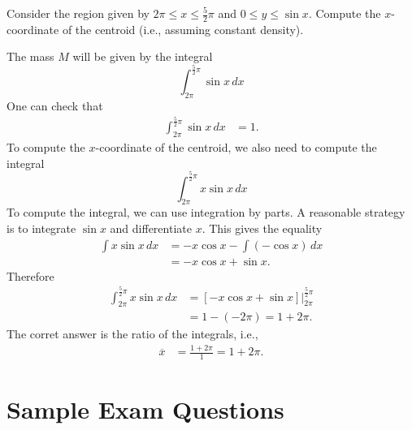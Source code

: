 \documentclass{ximera}
\begin{document}
\begin{question}%

Consider the region given by \(2 \pi \leq x \leq \frac{5}{2} \pi\) and \(0 \leq y \leq \sin {x}\).
Compute the \(x\)-coordinate of the centroid (i.e., assuming constant density).
\begin{multiplechoice}
\choice{\(\displaystyle 3 \pi\)}
\choice{\(\displaystyle 4 \pi\)}
\end{multiplechoice}
\begin{feedback}
The mass  \(M\) will be given by the integral
\[ \int_{2 \pi}^{\frac{5}{2} \pi} \sin {x}\, dx \]
 One can check that
\[ \begin{aligned} \int_{2 \pi}^{\frac{5}{2} \pi} \sin {x}\, dx & = 1. \end{aligned} \]
To compute the  \(x\)-coordinate of the centroid, we also need to compute the integral 
\[ \int_{2 \pi}^{\frac{5}{2} \pi} x \sin {x}\, dx \]
 To compute the integral, we can use integration by parts. A reasonable strategy is to integrate  \(\sin {x}\) and differentiate  \(x\).
 This gives the equality
\[ \begin{aligned} \int x \sin {x}\, dx & = - x \cos {x} - \int \left(- \cos {x}\right)\, dx \\
 & = - x \cos {x} + \sin {x}. \end{aligned} \]
Therefore 
\[ \begin{aligned} \int_{2 \pi}^{\frac{5}{2} \pi} x \sin {x}\, dx & = \left. \left[- x \cos {x} + \sin {x} \right] \right|_{2 \pi}^{\frac{5}{2} \pi}\\ & = 1 - \left(- 2 \pi \right) = 1 + 2 \pi. \end{aligned} \]
The corret answer is the ratio of the integrals, i.e.,
\[ \begin{aligned} \overline{x} & = \frac{1 + 2 \pi}{1} = 1 + 2 \pi. \end{aligned} \]
\end{feedback}

\end{question}

\section*{Sample Exam Questions}
\end{document}
